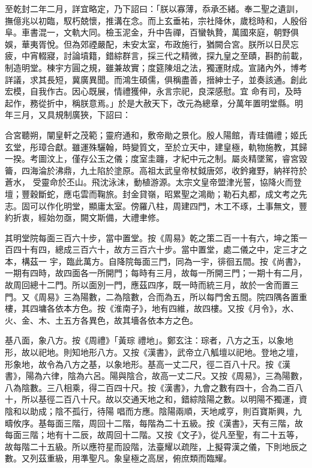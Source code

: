 \begin{pinyinscope}
 至乾封二年二月，詳宜略定，乃下詔曰：「朕以寡薄，忝承丕緒。奉二聖之遺訓，撫億兆以初臨，馭朽兢懷，推溝在念。而上玄垂祐，宗社降休，歲稔時和，人殷俗
 阜。車書混一，文軌大同。檢玉泥金，升中告禪，百蠻執贄，萬國來庭，朝野俱娛，華夷胥悅。但為郊禋嚴配，未安太室，布政施行，猶闕合宮。朕所以日昃忘疲，中宵輟寢，討論墳籍，錯綜群言，採三代之精微，探九皇之至賾，斟酌前載，制造明堂。棟宇方圓之規，雖兼故實；度筵陳俎之法，獨運財成。宣諸內外，博考詳議，求其長短，冀廣異聞。而鴻生碩儒，俱稱盡善，搢紳士子，並奏該通。創此宏模，自我作古。因心既展，情禮獲伸，永言宗祀，良深感慰。宜
 命有司，及時起作，務從折中，稱朕意焉。」於是大赦天下，改元為總章，分萬年置明堂縣。明年三月，又具規制廣狹，下詔曰：



 合宮聽朔，闡皇軒之茂範；靈府通和，敷帝勛之景化。殷人陽館，青珪備禮；姬氏玄堂，彤璋合獻。雖運殊驪翰，時變質文，至於立天中，建皇極，軌物施教，其歸一揆。考圖汶上，僅存公玉之儀；度室圭躔，才紀中元之制。屬炎精墜駕，睿宮毀籥，四海淪於沸鼎，九土陷於塗原。高祖太武皇帝杖鉞唐郊，收鈐雍野，納祥符於蒼水，
 受靈命於丕山。飛沈泳沫，動植游源。太宗文皇帝盟津光誓，協降火而登壇；豐穀斷蛇，應屯雲而鞠旅。封金貸嶺，昭累聖之鴻勛；勒石丸都，成文考之先志。固可以作化明堂，顯庸太室。傍羅八柱，周建四門，木工不琢，土事無文，豐約折衷，經始勿亟，闕文斯備，大禮聿修。



 其明堂院每面三百六十步，當中置堂。按《周易》乾之策二百一十有六，坤之策一百四十有四，總成三百六十，故方三百六十步。當中置堂，處二儀之中，定三才之本，構茲一
 宇，臨此萬方。自降院每面三門，同為一宇，徘徊五間。按《尚書》，一期有四時，故四面各一所開門；每時有三月，故每一所開三門；一期十有二月，故周回總十二門。所以面別一門，應茲四序，既一時而統三月，故於一舍而置三門。又《周易》三為陽數，二為陰數，合而為五，所以每門舍五間。院四隅各置重樓，其四墉各依本方色。按《淮南子》，地有四維，故四樓。又按《月令》，水、火、金、木、土五方各異色，故其墻各依本方之色。



 基八面，象八方。按《周禮》「黃琮
 禮地」。鄭玄注：琮者，八方之玉，以象地形，故以祀地。則知地形八方。又按《漢書》，武帝立八觚壇以祀地。登地之壇，形象地，故令為八方之基，以象地形。基高一丈二尺，徑二百八十尺。按《漢書》，陽為六律，陰為六呂。陽與陰合，故高一丈二尺。又按《周易》，三為陽數，八為陰數。三八相乘，得二百四十尺。按《漢書》，九會之數有四十，合為二百八十，所以基徑二百八十尺。故以交通天地之和，錯綜陰陽之數。以明陽不獨運，資陰和以助成；陰不孤行，待陽
 唱而方應。陰陽兩順，天地咸亨，則百寶斯興，九疇攸序。基每面三階，周回十二階，每階為二十五級。按《漢書》，天有三階，故每面三階；地有十二辰，故周回十二階。又按《文子》，從凡至聖，有二十五等，故每階二十五級。所以應符星而設階，法臺耀以疏陛，上擬霄漢之儀，下則地辰之數。又列茲重級，用準聖凡。象皇極之高居，俯庶類而臨耀。




\end{pinyinscope}
